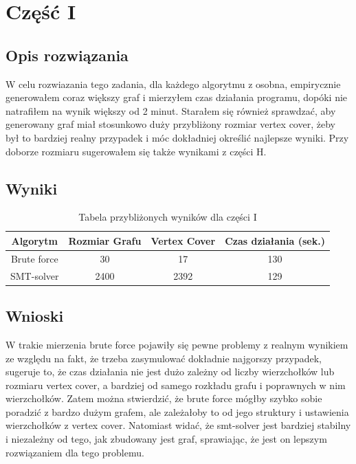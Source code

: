\documentclass{article}
\begin{document}
\section{Część I}
\subsection{Opis rozwiązania}
W celu rozwiazania tego zadania, dla każdego algorytmu z osobna, 
empirycznie generowałem coraz większy graf i mierzyłem czas działania programu,
dopóki nie natrafiłem na wynik większy od 2 minut. Starałem się również sprawdzać, 
aby generowany graf miał stosunkowo duży przybliżony rozmiar vertex cover, żeby 
był to bardziej realny przypadek i móc dokładniej określić najlepsze wyniki. 
Przy doborze rozmiaru sugerowałem się także wynikami z części H.

\subsection{Wyniki}
\begin{table}[h!]
    \centering
    \begin{tabular}{cccc}
        \toprule
        Algorytm & Rozmiar Grafu & Vertex Cover & Czas działania (sek.) \\
        \midrule
        Brute force & 30 & 17 & 130 \\
        SMT-solver & 2400 & 2392 & 129 \\
        \bottomrule
    \end{tabular}
    \caption{Tabela przybliżonych wyników dla części I}
    \label{tab:resultsI}
\end{table}

\subsection{Wnioski}
W trakie mierzenia brute force pojawiły się pewne problemy z realnym wynikiem ze względu na fakt, że trzeba zasymulować dokładnie najgorszy przypadek, sugeruje to, 
że czas działania nie jest dużo zależny od liczby wierzchołków lub rozmiaru vertex cover, a bardziej od samego rozkładu grafu i poprawnych w nim wierzchołków.
Zatem można stwierdzić, że brute force mógłby szybko sobie poradzić z bardzo dużym grafem, ale zależałoby to od jego struktury i ustawienia wierzchołków z vertex cover.
Natomiast widać, że smt-solver jest bardziej stabilny i niezależny od tego, jak zbudowany jest graf, sprawiając, że jest on lepszym rozwiązaniem dla tego problemu.
\end{document}
